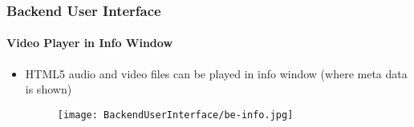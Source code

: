 
\begin{frame}[fragile]
	\frametitle{Backend User Interface}
	\framesubtitle{Video Player in Info Window}
	\begin{itemize}
		\item HTML5 audio and video files can be played in info window\newline
			(where meta data is shown)
		\begin{figure}
			\texttt{[image: BackendUserInterface/be-info.jpg]}
		\end{figure}

	\end{itemize}

\end{frame}

